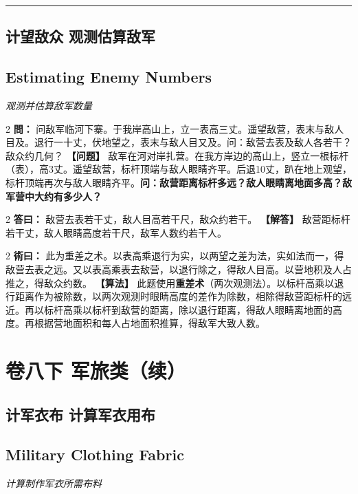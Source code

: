 \documentclass[11pt,a4paper]{article}
\newcommand{\longline}{\noindent\rule{\textwidth}{0.4pt}}
\newcommand{\bilingualProblem}[2]{%
  \vspace{0.6em}%
  \begin{paracol}{2}%
  \noindent\textcolor{problemcolor}{\textbf{問：}}#1%
  \switchcolumn%
  \noindent\textcolor{problemcolor}{\textbf{【问题】}}#2%
  \end{paracol}%
  \vspace{0.3em}%
}
\newcommand{\bilingualAnswer}[2]{%
  \begin{paracol}{2}%
  \noindent\textcolor{answercolor}{\textbf{答曰：}}#1%
  \switchcolumn%
  \noindent\textcolor{answercolor}{\textbf{【解答】}}#2%
  \end{paracol}%
  \vspace{0.3em}%
}
\newcommand{\bilingualMethod}[2]{%
  \begin{paracol}{2}%
  \noindent\textcolor{methodcolor}{\textbf{術曰：}}#1%
  \switchcolumn%
  \noindent\textcolor{methodcolor}{\textbf{【算法】}}#2%
  \end{paracol}%
  \vspace{0.3em}%
}
\newcommand{\bilingualSubsection}[2]{%
  \subsection{#1}
  \begin{center}
  {\small\color{sectioncolor}\textit{#2}}
  \end{center}
  \vspace{0.3em}
}
\begin{document}
\vspace{0.5em}
\longline

\subsection{计望敌众 \quad 观测估算敌军}
\bilingualSubsection{Estimating Enemy Numbers}{观测并估算敌军数量}

\bilingualProblem{%
问敌军临河下寨。于我岸高山上，立一表高三丈。遥望敌营，表末与敌人目及。退行一十丈，伏地望之，表末与敌人目又及。问：敌营去表及敌人各若干？敌众约几何？%
}{%
敌军在河对岸扎营。在我方岸边的高山上，竖立一根标杆（表），高3丈。遥望敌营，标杆顶端与敌人眼睛齐平。后退10丈，趴在地上观望，标杆顶端再次与敌人眼睛齐平。\textbf{问：敌营距离标杆多远？敌人眼睛离地面多高？敌军营中大约有多少人？}%
}

\bilingualAnswer{%
敌营去表若干丈，敌人目高若干尺，敌众约若干。%
}{%
敌营距标杆若干丈，敌人眼睛高度若干尺，敌军人数约若干人。%
}

\bilingualMethod{%
此为重差之术。以表高乘退行为实，以两望之差为法，实如法而一，得敌营去表之远。又以表高乘表去敌营，以退行除之，得敌人目高。以营地积及人占推之，得敌众约数。%
}{%
此题使用\textbf{重差术}（两次观测法）。以标杆高乘以退行距离作为被除数，以两次观测时眼睛高度的差作为除数，相除得敌营距标杆的远近。再以标杆高乘以标杆到敌营的距离，除以退行距离，得敌人眼睛离地面的高度。再根据营地面积和每人占地面积推算，得敌军大致人数。%
}

\newpage

\section{卷八下 \quad 军旅类（续）}
\label{sec:fasc8b}

\begin{center}
\end{center}

\medskip

\subsection{计军衣布 \quad 计算军衣用布}
\bilingualSubsection{Military Clothing Fabric}{计算制作军衣所需布料}
\end{document}
